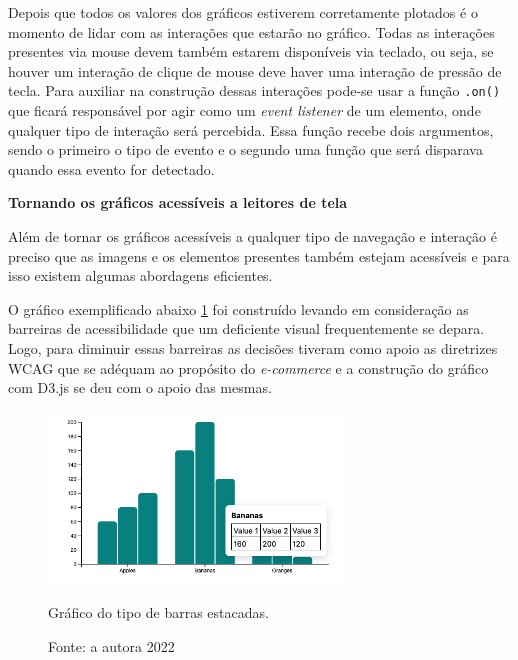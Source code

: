 Depois que todos os valores dos gráficos estiverem corretamente plotados é o momento de lidar com as interações que estarão no gráfico. Todas as interações presentes via mouse devem também estarem disponíveis via teclado, ou seja, se houver um interação de clique de mouse deve haver uma interação de pressão de tecla. Para auxiliar na construção dessas interações pode-se usar a função \lstinline{.on()} que ficará responsável por agir como um \textit{event listener} de um elemento, onde qualquer tipo de interação será percebida. Essa função recebe dois argumentos, sendo o primeiro o tipo de evento e o segundo uma função que será disparava quando essa evento for detectado. 

{\textbf{Tornando os gráficos acessíveis a leitores de tela}}

{Além de tornar os gráficos acessíveis a qualquer tipo de navegação e interação é preciso que as imagens e os elementos presentes também estejam acessíveis e para isso existem algumas abordagens eficientes.  

O gráfico exemplificado abaixo \ref{fig:grafico-d3} foi construído levando em consideração as barreiras de acessibilidade que um deficiente visual frequentemente se depara. Logo, para diminuir essas barreiras as decisões tiveram como apoio as diretrizes WCAG que se adéquam ao propósito do \textit{e-commerce} e a construção do gráfico com D3.js se deu com o apoio das mesmas. 


\begin{figure}[ht]
  	\center
    \includegraphics[width=0.7\textwidth]{images/barchart-tooltip.png}
    \caption{Gráfico do tipo de barras estacadas.}
    \caption*{Fonte: a autora 2022}
    \label{fig:grafico-d3}
\end{figure} 

}


